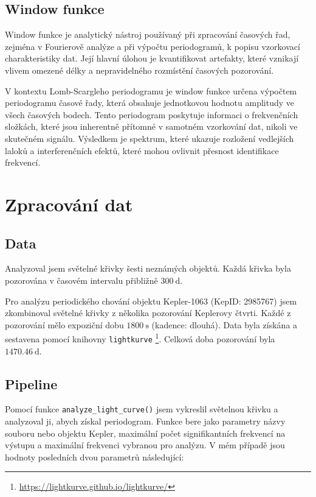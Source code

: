\documentclass[a4paper,11pt,twocolumn]{article}
\begin{document}
        \subsection{Window funkce}
            Window funkce je analytický nástroj používaný při zpracování časových řad, zejména v Fourierově analýze a při výpočtu periodogramů, k popisu vzorkovací charakteristiky dat. Její hlavní úlohou je kvantifikovat artefakty, které vznikají vlivem omezené délky a nepravidelného rozmístění časových pozorování.

            V kontextu Lomb-Scargleho periodogramu je window funkce určena výpočtem periodogramu časové řady, která obsahuje jednotkovou hodnotu amplitudy ve všech časových bodech. Tento periodogram poskytuje informaci o frekvenčních složkách, které jsou inherentně přítomné v samotném vzorkování dat, nikoli ve skutečném signálu. Výsledkem je spektrum, které ukazuje rozložení vedlejších laloků a interferenčních efektů, které mohou ovlivnit přesnost identifikace frekvencí.

    \section{Zpracování dat}
        \subsection{Data}
            Analyzoval jsem světelné křivky šesti neznámých objektů. Každá křivka byla pozorována v časovém intervalu přibližně $300 ~\text{d}$.

            Pro analýzu periodického chování objektu Kepler-1063 (KepID: 2985767) jsem zkombinoval světelné křivky z několika pozorování Keplerovy čtvrti. Každé z pozorování mělo expoziční dobu $1800 ~\text{s}$ (kadence: dlouhá). Data byla získána a sestavena pomocí knihovny \texttt{lightkurve} \footnote{\url{https://lightkurve.github.io/lightkurve/}}. Celková doba pozorování byla $1470.46  ~ \text{d}$.

        \subsection{Pipeline}
            Pomocí funkce \texttt{analyze\_light\_curve()} jsem vykreslil světelnou křivku a analyzoval ji, abych získal periodogram. Funkce bere jako parametry názvy souboru nebo objektu Kepler, maximální počet signifikantních frekvencí na výstupu a maximální frekvenci vybranou pro analýzu. V mém případě jsou hodnoty posledních dvou parametrů následující: 
            
\end{document}
